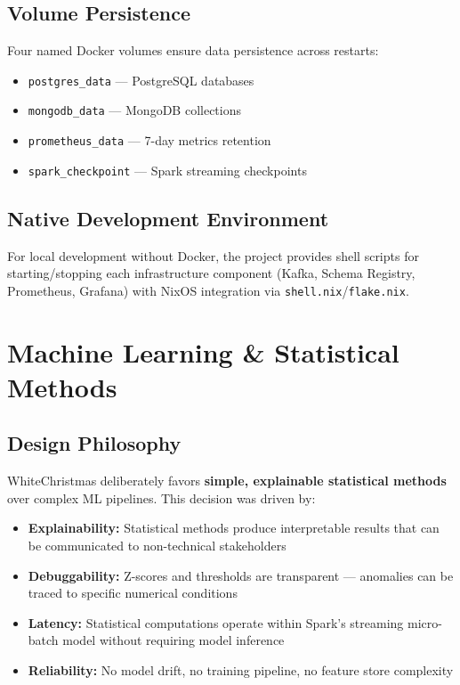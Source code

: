 \documentclass[12pt,a4paper]{article}
\begin{document}
\subsection{Volume Persistence}

Four named Docker volumes ensure data persistence across restarts:
\begin{itemize}
  \item \texttt{postgres\_data} --- PostgreSQL databases
  \item \texttt{mongodb\_data} --- MongoDB collections
  \item \texttt{prometheus\_data} --- 7-day metrics retention
  \item \texttt{spark\_checkpoint} --- Spark streaming checkpoints
\end{itemize}

\subsection{Native Development Environment}

For local development without Docker, the project provides shell scripts for starting/stopping each infrastructure component (Kafka, Schema Registry, Prometheus, Grafana) with NixOS integration via \texttt{shell.nix}/\texttt{flake.nix}.

\section{Machine Learning \& Statistical Methods}

\subsection{Design Philosophy}

WhiteChristmas deliberately favors \textbf{simple, explainable statistical methods} over complex ML pipelines. This decision was driven by:
\begin{itemize}
  \item \textbf{Explainability:} Statistical methods produce interpretable results that can be communicated to non-technical stakeholders
  \item \textbf{Debuggability:} Z-scores and thresholds are transparent --- anomalies can be traced to specific numerical conditions
  \item \textbf{Latency:} Statistical computations operate within Spark's streaming micro-batch model without requiring model inference
  \item \textbf{Reliability:} No model drift, no training pipeline, no feature store complexity
\end{itemize}
\end{document}
